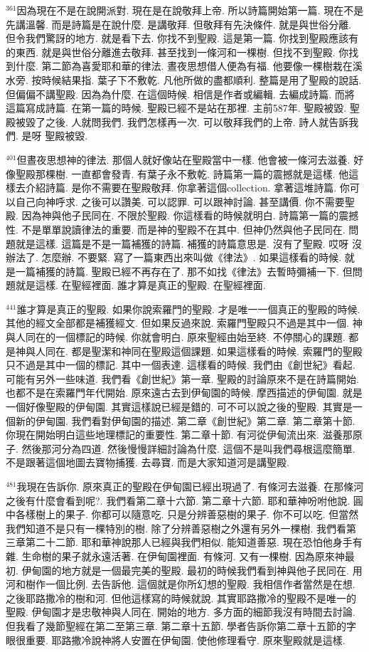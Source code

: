 \documentclass{book}
\begin{document}
$^{361}$因為現在不是在說開派對.
現在是在說敬拜上帝.
所以詩篇開始第一篇.
現在不是先講溫馨.
而是詩篇是在說什麼.
是講敬拜.
但敬拜有先決條件.
就是與世俗分離.
但令我們驚訝的地方.
就是看下去.
你找不到聖殿.
這是第一篇.
你找到聖殿應該有的東西.
就是與世俗分離進去敬拜.
甚至找到一條河和一棵樹.
但找不到聖殿.
你找到什麼.
第二節為喜愛耶和華的律法.
晝夜思想借人便為有福.
他要像一棵樹栽在溪水旁.
按時候結果指.
葉子下不敷乾.
凡他所做的盡都順利.
整篇是用了聖殿的說話.
但偏偏不講聖殿.
因為為什麼.
在這個時候.
相信是作者或編輯.
去編成詩篇.
而將這篇寫成詩篇.
在第一篇的時候.
聖殿已經不是站在那裡.
主前587年.
聖殿被毀.
聖殿被毀了之後.
人就問我們.
我們怎樣再一次.
可以敬拜我們的上帝.
詩人就告訴我們.
是呀 聖殿被毀.

$^{401}$但晝夜思想神的律法.
那個人就好像站在聖殿當中一樣.
他會被一條河去滋養.
好像聖殿那棵樹.
一直都會發青.
有葉子永不敷乾.
詩篇第一篇的震撼就是這樣.
他這樣去介紹詩篇.
是你不需要在聖殿敬拜.
你拿著這個collection.
拿著這堆詩篇.
你可以自己向神呼求.
之後可以讚美.
可以認罪.
可以跟神討論.
甚至講價.
你不需要聖殿.
因為神與他子民同在.
不限於聖殿.
你這樣看的時候就明白.
詩篇第一篇的震撼性.
不是單單說讀律法的重要.
而是神的聖殿不在其中.
但神仍然與他子民同在.
問題就是這樣.
這篇是不是一篇補獲的詩篇.
補獲的詩篇意思是.
沒有了聖殿.
哎呀 沒辦法了.
怎麼辦.
不要緊.
寫了一篇東西出來叫做《律法》.
如果這樣看的時候.
就是一篇補獲的詩篇.
聖殿已經不再存在了.
那不如找《律法》去暫時彌補一下.
但問題就是這樣.
在聖經裡面.
誰才算是真正的聖殿.
在聖經裡面.

$^{441}$誰才算是真正的聖殿.
如果你說索羅門的聖殿.
才是唯一一個真正的聖殿的時候.
其他的經文全部都是補獲經文.
但如果反過來說.
索羅門聖殿只不過是其中一個.
神與人同在的一個標記的時候.
你就會明白.
原來聖經由始至終.
不停關心的課題.
都是神與人同在.
都是聖潔和神同在聖殿這個課題.
如果這樣看的時候.
索羅門的聖殿只不過是其中一個的標記.
其中一個表達.
這樣看的時候.
我們由《創世紀》看起.
可能有另外一些味道.
我們看《創世紀》第一章.
聖殿的討論原來不是在詩篇開始.
也都不是在索羅門年代開始.
原來遠古去到伊甸園的時候.
摩西描述的伊甸園.
就是一個好像聖殿的伊甸園.
其實這樣說已經是錯的.
可不可以說之後的聖殿.
其實是一個新的伊甸園.
我們看對伊甸園的描述.
第二章《創世紀》第二章.
第二章第十節.
你現在開始明白這些地理標記的重要性.
第二章十節.
有河從伊甸流出來.
滋養那原子.
然後那河分為四道.
然後慢慢詳細討論為什麼.
這個不是叫我們尋根這麼簡單.
不是跟著這個地圖去寶物捕獲.
去尋寶.
而是大家知道河是講聖殿.

$^{481}$我現在告訴你.
原來真正的聖殿在伊甸園已經出現過了.
有條河去滋養.
在那條河之後有什麼會看到呢?.
我們看第二章十六節.
第二章十六節.
耶和華神吩咐他說.
圓中各樣樹上的果子.
你都可以隨意吃.
只是分辨善惡樹的果子.
你不可以吃.
但當然我們知道不是只有一棵特別的樹.
除了分辨善惡樹之外還有另外一棵樹.
我們看第三章第二十二節.
耶和華神說那人已經與我們相似.
能知道善惡.
現在恐怕他身手有雜.
生命樹的果子就永遠活著.
在伊甸園裡面.
有條河.
又有一棵樹.
因為原來神最初.
伊甸園的地方就是一個最完美的聖殿.
最初的時候我們看到神與他子民同在.
用河和樹作一個比例.
去告訴他.
這個就是你所幻想的聖殿.
我相信作者當然是在想.
之後耶路撒冷的樹和河.
但他這樣寫的時候就說.
其實耶路撒冷的聖殿不是唯一的聖殿.
伊甸園才是忠敬神與人同在.
開始的地方.
多方面的細節我沒有時間去討論.
但我看了幾節聖經在第二至第三章.
第二章十五節.
學者告訴你第二章十五節的字眼很重要.
耶路撒冷說神將人安置在伊甸園.
使他修理看守.
原來聖殿就是這樣.
\end{document}
